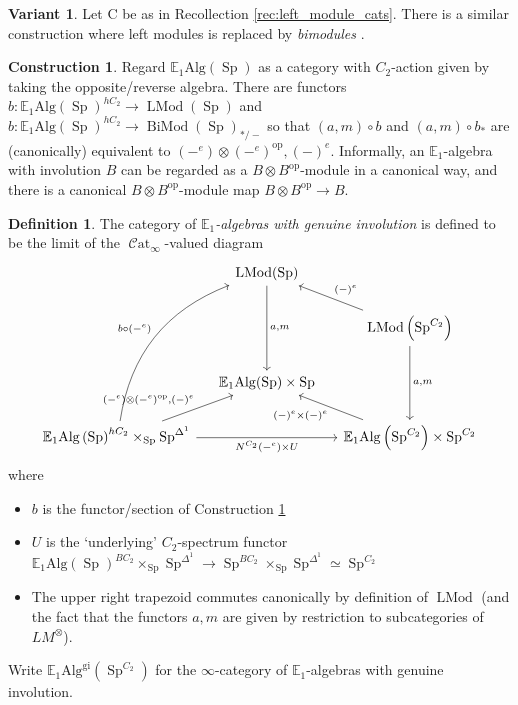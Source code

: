 \documentclass{article}
\DeclareMathOperator{\Cat}{\mathcal{C}at} %
\DeclareMathOperator{\LMod}{LMod} %
\DeclareMathOperator{\BiMod}{BiMod} %
\DeclareMathOperator{\Spectra}{Sp} %
\newcommand{\op}{\mathrm{op}} %
\theoremstyle{definition}
\newtheorem{definition}[equation]{Definition}
\newtheorem{construction}[equation]{Construction}
\newtheorem{variant}[equation]{Variant}
\begin{document}
\begin{variant}
    Let $ \mathrm{C} $ be as in Recollection \ref{rec:left_module_cats}. 
    There is a similar construction where left modules is replaced by \emph{bimodules} \cite[Definition 4.3.1.12]{LurHA}. 
\end{variant}
\begin{construction}\label{cons:alg_inv_is_bimod_canonically}
    Regard $ \mathbb{E}_1\mathrm{Alg}(\Spectra) $ as a category with $ C_2 $-action given by taking the opposite/reverse algebra.  
    There are functors $ b \colon \mathbb{E}_1\mathrm{Alg}\left(\Spectra\right)^{hC_2} \to \LMod(\Spectra) $ and $ b \colon \mathbb{E}_1\mathrm{Alg}\left(\Spectra\right)^{hC_2} \to \BiMod(\Spectra)_{*/-} $ so that $ (a, m) \circ b $ and $ (a, m)\circ b_* $ are (canonically) equivalent to $ (-^e) \otimes(-^ e)^\mathrm{op}, (-)^e $. 
    Informally, an $ \mathbb{E}_1 $-algebra with involution $ B $ can be regarded as a $ B \otimes B^\op $-module in a canonical way, and there is a canonical $ B \otimes B^\op $-module map $ B \otimes B^\op \to B $. 
\end{construction}
\begin{definition}
    The category of \emph{$\mathbb{E}_1$-algebras with genuine involution} is defined to be the limit of the $\Cat_\infty$-valued diagram 
    \begin{equation}\label{diagram:E1_alg_gen_involution}
    \begin{tikzcd}[column sep=small]
        & \LMod(\Spectra) \ar[dd,"{a,m}"]  & \\
        & & \LMod\left(\Spectra^{C_2}\right) \ar[dd,"{a, m}"] \ar[lu,"{(-)^e}"'] \\
        &\mathbb{E}_1\mathrm{Alg}(\Spectra) \times \Spectra & \\
        \mathbb{E}_1\mathrm{Alg}\left(\Spectra\right)^{hC_2} \times_{\Spectra} \Spectra^{\Delta^1}  \ar[rr,"{N^{C_2}(-^e) \times U}"'] \ar[ru,"{(-^e) \otimes(-^ e)^\mathrm{op}, (-)^e}"] \ar[ruuu,"{b \circ (-^e)}", bend left=30] & &\mathbb{E}_1\mathrm{Alg}\left(\Spectra^{C_2}\right) \times \Spectra^{C_2} \ar[lu,"{(-)^e \times (-)^e}"]
    \end{tikzcd}
    \end{equation}
    where
    \begin{itemize}
        \item $ b $ is the functor/section of Construction \ref{cons:alg_inv_is_bimod_canonically} 
        \item $ U $ is the `underlying' $C_2$-spectrum functor $ \mathbb{E}_1\mathrm{Alg}\left(\Spectra\right)^{BC_2} \times_{\Spectra} \Spectra^{\Delta^1} \to \Spectra^{BC_2} \times_{\Spectra} \Spectra^{\Delta^1} \simeq \Spectra^{C_2} $ 
        \item The upper right trapezoid commutes canonically by definition of $ \LMod $ (and the fact that the functors $ a, m $ are given by restriction to subcategories of $ LM^\otimes $). 
    \end{itemize}
    Write $ \mathbb{E}_1\mathrm{Alg}^{\mathrm{gi}}\left(\Spectra^{C_2}\right) $ for the $\infty $-category of $\mathbb{E}_1$-algebras with genuine involution. 
\end{definition}
\end{document}
